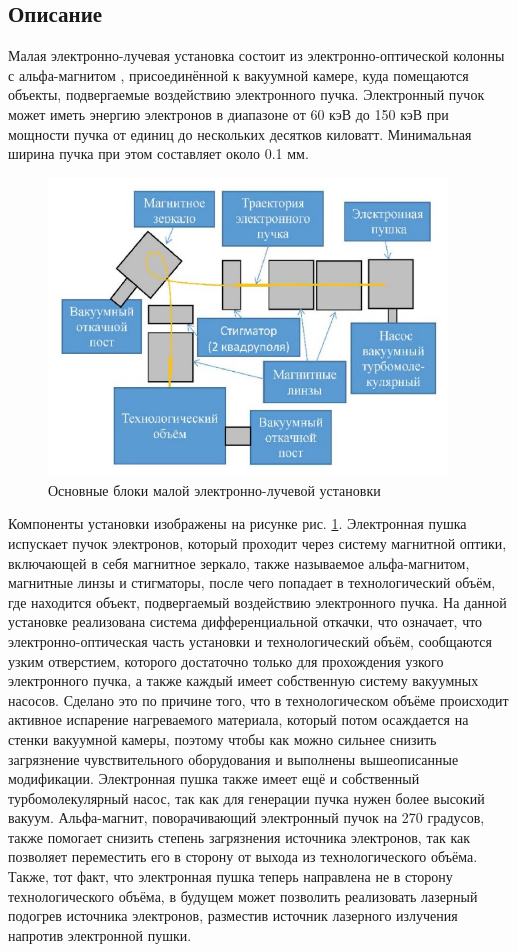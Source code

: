 \documentclass[14pt,russian,a4paper]{extarticle}
\begin{document}
\subsection{Описание}
Малая электронно-лучевая установка состоит из электронно-оптической колонны с альфа-магнитом \cite{alpha_magnet}, присоединённой к вакуумной камере, куда помещаются объекты, подвергаемые воздействию электронного пучка. Электронный пучок может иметь энергию электронов в диапазоне от 60 кэВ до 150 кэВ при мощности пучка от единиц до нескольких десятков киловатт. \cite{facility_desc} Минимальная ширина пучка при этом составляет около 0.1 мм.
\begin{figure}[h!]
    \centerline{\includegraphics[width=300pt]{media/alpha_scheme.jpeg}}
    \caption{Основные блоки малой электронно-лучевой установки}
    \label{fig:facility}
\end{figure}
\newline
Компоненты установки изображены на рисунке рис. \ref{fig:facility}. Электронная пушка испускает пучок электронов, который проходит через систему магнитной оптики, включающей в себя магнитное зеркало, также называемое альфа-магнитом, магнитные линзы и стигматоры, после чего попадает в технологический объём, где находится объект, подвергаемый воздействию электронного пучка. На данной установке реализована система дифференциальной откачки, что означает, что электронно-оптическая часть установки и технологический объём, сообщаются узким отверстием, которого достаточно только для прохождения узкого электронного пучка, а также каждый имеет собственную систему вакуумных насосов. Сделано это по причине того, что в технологическом объёме происходит активное испарение нагреваемого материала, который потом осаждается на стенки вакуумной камеры, поэтому чтобы как можно сильнее снизить загрязнение чувствительного оборудования и выполнены вышеописанные модификации. Электронная пушка также имеет ещё и собственный турбомолекулярный насос, так как для генерации пучка нужен более высокий вакуум. Альфа-магнит, поворачивающий электронный пучок на 270 градусов, также помогает снизить степень загрязнения источника электронов, так как позволяет переместить его в сторону от выхода из технологического объёма. Также, тот факт, что электронная пушка теперь направлена не в сторону технологического объёма, в будущем может позволить реализовать лазерный подогрев источника электронов, разместив источник лазерного излучения напротив электронной пушки.
\end{document}
